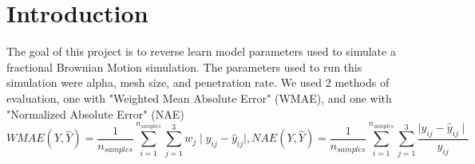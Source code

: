 \documentclass[a4paper, 12pt]{article}
\begin{document}
        \section{Introduction}
        The goal of this project is to reverse learn model parameters used to simulate a fractional Brownian Motion \cite{fBM} simulation. The parameters used to run this simulation were alpha, mesh size, and penetration rate. We used 2 methods of evaluation, one with "Weighted Mean Absolute Error" (WMAE), and one with "Normalized Absolute Error" (NAE)
        \[WMAE(Y, \hat{Y}) = \frac{1}{n_{samples}}\sum^{n_{samples}}_{i=1}\sum^{3}_{j=1}w_j\mid y_{ij}-\hat{y}_{ij} \mid, NAE(Y, \hat{Y}) = \frac{1}{n_{samples}}\sum^{n_{samples}}_{i=1}\sum^{3}_{j=1} \frac{\mid y_{ij}-\hat{y}_{ij} \mid}{y_{ij}}\]
        
        \newpage
\end{document}
